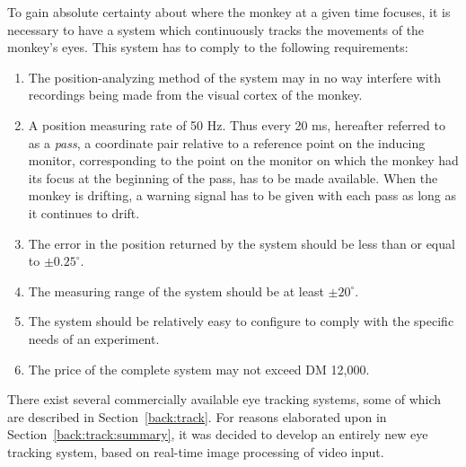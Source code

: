 To gain absolute certainty about where the monkey at a given time
focuses, it is necessary to have a system which continuously tracks
the movements of the monkey's eyes.  This system has to comply to the
following requirements:
\begin{enumerate}
\item The position-analyzing method of the system may in no way
  interfere with recordings being made from the visual cortex of the
  monkey.
\item\label{req:first}A position measuring rate of 50 Hz.  Thus every
  20 ms, hereafter referred to as a {\em pass\/}, a coordinate pair
  relative to a reference point on the inducing monitor, corresponding
  to the point on the monitor on which the monkey had its focus at the
  beginning of the pass, has to be made available.  When the monkey is
  drifting, a warning signal has to be given with each pass as long as
  it continues to drift.
\item\label{req:2}The error in the position returned by the system
  should be less than or equal to $\pm 0.25^{\circ}$.
\item\label{req:3}The measuring range of the system should be at least
  $\pm 20^{\circ}$.
\item\label{req:4}The system should be relatively easy to configure to
  comply with the specific needs of an experiment.
\item\label{req:last}The price of the complete system may not exceed
  DM 12,000.
\end{enumerate}

There exist several commercially available eye tracking systems, some
of which are described in Section~\ref{back:track}.  For reasons
elaborated upon in Section~\ref{back:track:summary}, it was decided to
develop an entirely new eye tracking system, based on real-time image
processing of video input.

